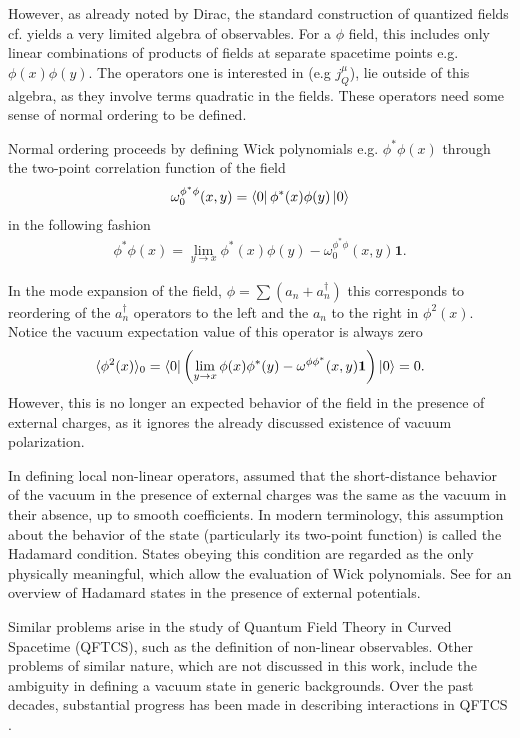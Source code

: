 However, as already noted by Dirac, the standard construction of quantized fields cf. \cite{Peskin:1995ev} yields a very limited  algebra of observables. 
For a $\phi$ field, this includes only linear combinations of products of fields at separate spacetime points e.g. $\phi(x) \phi(y)$.  The operators one is interested in (e.g $j^\mu_Q$), lie outside of this algebra, as they involve terms quadratic in the fields. These operators need some sense of normal ordering to be defined.

Normal ordering proceeds by defining Wick polynomials e.g. $\phi^*\phi(x)$ through the two-point correlation function of the field
\begin{align}
    \omega^{\phi ^*\phi}_0 (x, y) = \bra{0} \phi^*(x) \phi(y) \ket{0} 
\end{align}
in the following fashion
\begin{align}
    \phi^*\phi(x) = \lim_{y\to x} \phi^*(x) \phi(y) - \omega^{\phi^* \phi}_0 (x, y) \mathbf{1}.
\end{align}

In the mode expansion of the field, $\phi = \sum (a_n + a_n^\dagger)$ this corresponds to reordering of the $a_n^\dagger$ operators to the left and the $a_n$ to the right in $\phi^2(x)$.
Notice the vacuum expectation value of this operator is always zero 
\begin{align}
 \langle \phi^2(x) \rangle_0 = \bra{0}  \left( 
 \lim_{y\to x} \phi(x) \phi^*(y) - \omega^{\phi \phi^*} (x, y) \mathbf{1}
    \right) \ket{0} = 0.
\end{align}
However, this is no longer an expected behavior of the field in the presence of external charges,  as it ignores the already discussed existence of vacuum polarization. 

In defining local non-linear operators, \cite{Dirac1934} assumed that the short-distance behavior of the vacuum in the presence of external charges was the same as the vacuum in their absence, up to smooth coefficients. In modern terminology, this assumption about the behavior of the state (particularly its two-point function) is called the Hadamard condition. States obeying this condition are regarded as the only physically meaningful, which allow the evaluation of Wick polynomials. See \cite{Schl2015} for an overview of Hadamard states in the presence of external potentials.

Similar problems arise in the study of Quantum Field Theory in Curved Spacetime (QFTCS), such as the definition of non-linear observables. Other problems of similar nature, which are not discussed in this work, include the ambiguity in defining a vacuum state in generic backgrounds. Over the past decades, substantial progress has been made in describing interactions in QFTCS \cite{Brunetti1996, Brunetti2000, Sahlmann2000, Hollands_2002, Hollands_2015, Brunetti_2003}.

